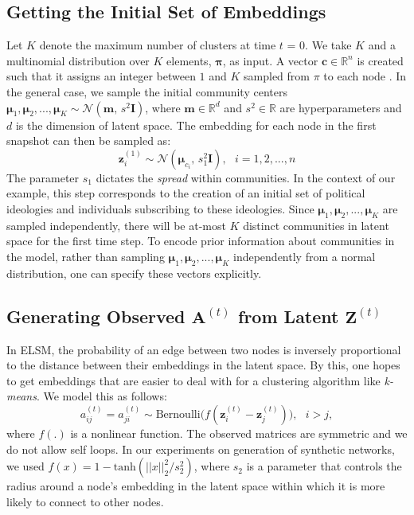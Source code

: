 \documentclass[letterpaper]{article}
\begin{document}
\subsection{Getting the Initial Set of Embeddings}
\label{section:gettinginitialsetofembeddings}
Let $K$ denote the maximum number of clusters at time $t$ = 0. We take $K$ and a multinomial distribution over $K$ elements, $\mathbf{\pi}$, as input. A vector $\mathbf{c} \in \mathbb{R}^n$ is created such that it assigns an integer between $1$ and $K$ sampled from $\pi$ to each node . In the general case, we sample the initial community centers $\bm{\mu}_1, \bm{\mu}_2, ..., \bm{\mu}_K \sim \mathcal{N}(\mathbf{m},\, s^2\mathbf{I})$, where $\mathbf{m} \in \mathbb{R}^d$ and $s^2 \in \mathbb{R}$ are hyperparameters and $d$ is the dimension of latent space. The embedding for each node in the first snapshot can then be sampled as:
\begin{equation}
    \label{eq:initial-assignment}
    \mathbf{z}^{(1)}_i \sim \mathcal{N}(\bm{\mu}_{c_i},\, s_1^2\mathbf{I}), \,\,\,\, i=1, 2, ..., {n}
\end{equation}
The parameter $s_1$ dictates the \textit{spread} within communities. In the context of our example, this step corresponds to the creation of an initial set of political ideologies and individuals subscribing to these ideologies. Since $\bm{\mu}_1, \bm{\mu}_2, ..., \bm{\mu}_K$ are sampled independently, there will be at-most $K$ distinct communities in latent space for the first time step. To encode prior information about communities in the model, rather than sampling $\bm{\mu}_1, \bm{\mu}_2, ..., \bm{\mu}_K$ independently from a normal distribution, one can specify these vectors explicitly.


\subsection{Generating  Observed $\mathbf{A}^{(t)}$ from Latent $\mathbf{Z}^{(t)}$}
\label{section:generatingobservedatfromlatentzt}
In ELSM, the probability of an edge between two nodes is inversely proportional to the distance between their embeddings in the latent space. By this, one hopes to get embeddings that are easier to deal with for a clustering algorithm like \textit{k-means}. We model this as follows:
\begin{equation}
    \label{eq:observedgivenlatent}
    a_{ij}^{(t)} = a_{ji}^{(t)} \sim \mathrm{Bernoulli}\Big(f(\mathbf{z}_i^{(t)} - \mathbf{z}_j^{(t)})\Big), \,\,\,\, i > j,
\end{equation}
where $f(.)$ is a nonlinear function. The observed matrices are symmetric and we do not allow self loops. In our experiments on generation of synthetic networks, we used $f(x) = 1 - \mathrm{tanh}(||x||_2^2/{s}_2^2)$, where ${s}_2$ is a parameter that controls the radius around a node's embedding in the latent space within which it is more likely to connect to other nodes.
\end{document}
